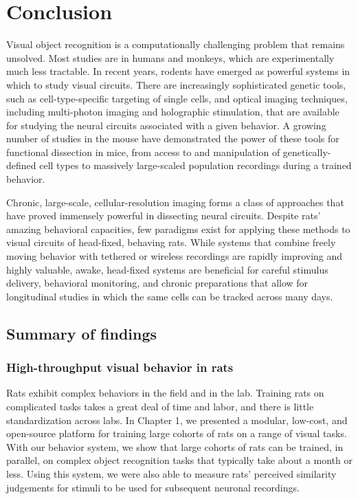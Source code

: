 \chapter{Conclusion}
\label{conclusion}

Visual object recognition is a computationally challenging problem that remains unsolved. Most studies are in humans and monkeys, which are experimentally much less tractable. In recent years, rodents have emerged as powerful systems in which to study visual circuits. There are increasingly sophisticated genetic tools, such as cell-type-specific targeting of single cells, and optical imaging techniques, including multi-photon imaging and  holographic stimulation, that are available for studying the neural circuits associated with a given behavior. A growing number of studies in the mouse have demonstrated the power of these tools for functional dissection in mice, from access to and manipulation of genetically-defined cell types to massively large-scaled population recordings during a trained behavior.

Chronic, large-scale, cellular-resolution imaging forms a class of approaches that have proved immensely powerful in dissecting neural circuits. Despite rats’ amazing behavioral capacities, few paradigms exist for applying these methods to visual circuits of head-fixed, behaving rats. While systems that combine freely moving behavior with tethered or wireless recordings are rapidly improving and highly valuable, awake, head-fixed systems are beneficial for careful stimulus delivery, behavioral monitoring, and chronic preparations that allow for longitudinal studies in which the same cells can be tracked across many days.   


\section{Summary of findings} 
\subsection{High-throughput visual behavior in rats}
Rats exhibit complex behaviors in the field and in the lab. Training rats on complicated tasks takes a great deal of time and labor, and there is little standardization across labs. In Chapter 1, we presented a modular, low-cost, and open-source platform for training large cohorts of rats on a range of visual tasks. With our behavior system, we show that large cohorts of rats can be trained, in parallel, on complex object recognition tasks that typically take about a month or less. Using this system, we were also able to measure rats' perceived similarity judgements for stimuli to be used for subsequent neuronal recordings. 

